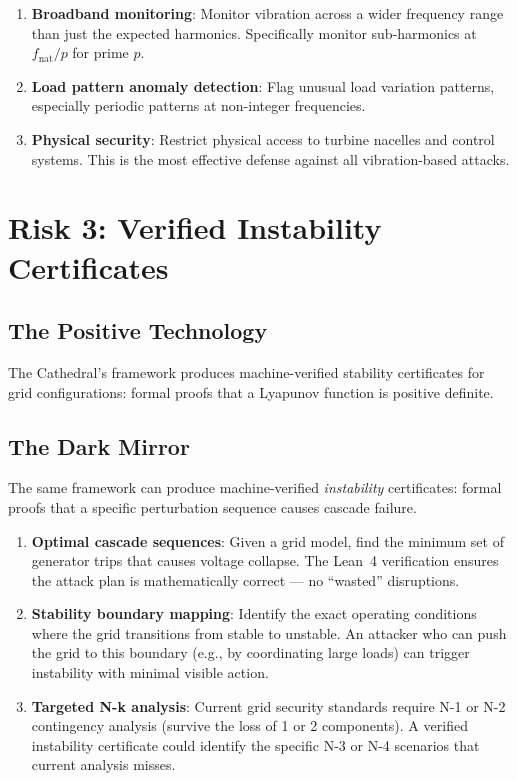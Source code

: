 \documentclass[11pt,a4paper]{article}
\begin{document}
\begin{enumerate}
  \item \textbf{Broadband monitoring}: Monitor vibration across a
    wider frequency range than just the expected harmonics.
    Specifically monitor sub-harmonics at $f_{\text{nat}}/p$ for
    prime $p$.
  \item \textbf{Load pattern anomaly detection}: Flag unusual load
    variation patterns, especially periodic patterns at non-integer
    frequencies.
  \item \textbf{Physical security}: Restrict physical access to
    turbine nacelles and control systems. This is the most effective
    defense against all vibration-based attacks.
\end{enumerate}

\section{Risk 3: Verified Instability Certificates}
\label{sec:instability}

\subsection{The Positive Technology}

The Cathedral's framework produces machine-verified stability
certificates for grid configurations: formal proofs that a
Lyapunov function is positive definite.

\subsection{The Dark Mirror}

The same framework can produce machine-verified \emph{instability}
certificates: formal proofs that a specific perturbation sequence
causes cascade failure.

\begin{enumerate}
  \item \textbf{Optimal cascade sequences}: Given a grid model,
    find the minimum set of generator trips that causes voltage
    collapse. The Lean~4 verification ensures the attack plan is
    mathematically correct --- no ``wasted'' disruptions.

  \item \textbf{Stability boundary mapping}: Identify the exact
    operating conditions where the grid transitions from stable to
    unstable. An attacker who can push the grid to this boundary
    (e.g., by coordinating large loads) can trigger instability with
    minimal visible action.

  \item \textbf{Targeted N-k analysis}: Current grid security
    standards require N-1 or N-2 contingency analysis (survive the
    loss of 1 or 2 components). A verified instability certificate
    could identify the specific N-3 or N-4 scenarios that current
    analysis misses.
\end{enumerate}
\end{document}

